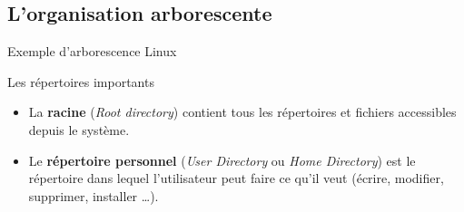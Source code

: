 \subsection{L'organisation arborescente}
\begin{frame}{Exemple d'arborescence Linux}
  \begin{alertblock}{Les répertoires importants}
    \begin{itemize}
    \item La \textbf{racine} (\textit{Root directory}) contient tous
      les répertoires et fichiers accessibles depuis le système.
    \item Le \textbf{répertoire personnel} (\textit{User Directory} ou
      \textit{Home Directory}) est le répertoire dans lequel
      l'utilisateur peut faire ce qu'il veut (écrire, modifier,
      supprimer, installer \dots).
    \end{itemize}
  \end{alertblock}
\end{frame}
